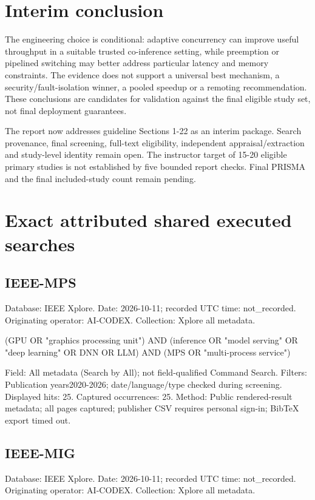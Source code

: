 \documentclass[12pt,a4paper]{article}
\begin{document}
\section*{Interim conclusion}
The engineering choice is conditional: adaptive concurrency can improve useful throughput in a suitable trusted co-inference setting, while preemption or pipelined switching may better address particular latency and memory constraints. The evidence does not support a universal best mechanism, a security/\allowbreak{}fault-isolation winner, a pooled speedup or a remoting recommendation. These conclusions are candidates for validation against the final eligible study set, not final deployment guarantees.


The report now addresses guideline Sections 1-22 as an interim package. Search provenance, final screening, full-text eligibility, independent appraisal/\allowbreak{}extraction and study-level identity remain open. The instructor target of 15-20 eligible primary studies is not established by five bounded report checks. Final PRISMA and the final included-study count remain pending.


\label{maintextend}\clearpage\appendix\section{Exact attributed shared executed searches}

\subsection{IEEE-MPS}
Database: IEEE Xplore. Date: 2026-10-11; recorded UTC time: not\_recorded. Originating operator: AI-CODEX. Collection: Xplore all metadata.


{\small\ttfamily\raggedright (GPU OR "graphics processing unit") AND (inference OR "model serving" OR "deep learning" OR DNN OR LLM) AND (MPS OR "multi-process service")\par}
Field: All metadata (Search by All); not field-qualified Command Search. Filters: Publication years2020-2026; date/\allowbreak{}language/\allowbreak{}type checked during screening. Displayed hits: 25. Captured occurrences: 25. Method: Public rendered-result metadata; all pages captured; publisher CSV requires personal sign-in; BibTeX export timed out.


\subsection{IEEE-MIG}
Database: IEEE Xplore. Date: 2026-10-11; recorded UTC time: not\_recorded. Originating operator: AI-CODEX. Collection: Xplore all metadata.
\end{document}
